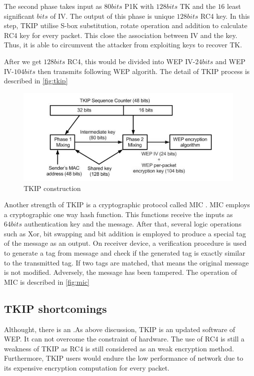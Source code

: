 The second phase takes input as $80 bits$ \ac{P1K} with $128 bits$ \ac{TK} and the $16$ least significant $bits$ of \ac{IV}. The output of this phase is unique $128 bits$ \ac{RC4} key. In this step, \ac{TKIP} utilise S-box substitution, rotate operation and addition to calculate \ac{RC4} key for every packet. This close the association between \ac{IV} and the key. Thus, it is able to circumvent the attacker from exploiting  keys to recover \ac{TK}.

After we get $128 bits$ \ac{RC4}, this would be divided into \ac{WEP} \ac{IV}-$24 bits$ and \ac{WEP} \ac{IV}-$104 bits$ then transmits following \ac{WEP} algorith. The detail of \ac{TKIP} process is described in \autoref{fig:tkip} %

\begin{figure}
	\includegraphics[scale=0.45]{images/tkip.png}
	\caption{\ac{TKIP} construction}
	\label{fig:tkip}
\end{figure}

Another strength of \ac{TKIP} is a cryptographic protocol called \ac{MIC} \cite{1318903}. \ac{MIC} employs a cryptographic one way hash function. This functions receive the inputs as $64 bits$ authentication key and the message. After that, several logic operations such as \ac{Xor}, bit swapping and bit addition is employed to produce a special tag of the message as an output. On receiver device, a verification procedure is used to generate a tag from message and check if the generated tag is exactly similar to the transmitted tag. If two tags are matched, that means the original message is not modified. Adversely, the message has been tampered. The operation of \ac{MIC} is described in \autoref{fig:mic}  %



\subsection{TKIP shortcomings}
Althought, there is an .As above discussion, \ac{TKIP} is an updated software of \ac{WEP}. It can not overcome the constraint of hardware. The use of \ac{RC4} is still a weakness of \ac{TKIP} as \ac{RC4} is still considered as an weak encryption method. Furthermore, \ac{TKIP} users would endure the low performance of network due to its expensive encryption computation for every packet. 
